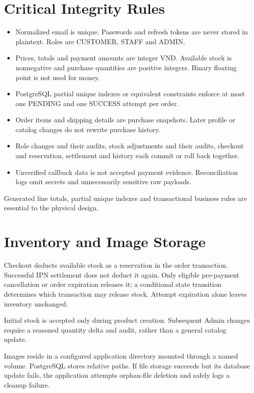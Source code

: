 \section{Critical Integrity Rules}
\begin{itemize}
\item Normalized email is unique. Passwords and refresh tokens are never stored in plaintext. Roles are CUSTOMER, STAFF and ADMIN.
\item Prices, totals and payment amounts are integer VND. Available stock is nonnegative and purchase quantities are positive integers. Binary floating point is not used for money.
\item PostgreSQL partial unique indexes or equivalent constraints enforce at most one PENDING and one SUCCESS attempt per order.
\item Order items and shipping details are purchase snapshots. Later profile or catalog changes do not rewrite purchase history.
\item Role changes and their audits, stock adjustments and their audits, checkout and reservation, settlement and history each commit or roll back together.
\item Unverified callback data is not accepted payment evidence. Reconciliation logs omit secrets and unnecessarily sensitive raw payloads.
\end{itemize}

Generated line totals, partial unique indexes and transactional business rules are essential to the physical design.

\section{Inventory and Image Storage}
Checkout deducts available stock as a reservation in the order transaction. Successful IPN settlement does not deduct it again. Only eligible pre-payment cancellation or order expiration releases it; a conditional state transition determines which transaction may release stock. Attempt expiration alone leaves inventory unchanged.

Initial stock is accepted only during product creation. Subsequent Admin changes require a reasoned quantity delta and audit, rather than a general catalog update.

Images reside in a configured application directory mounted through a named volume. PostgreSQL stores relative paths. If file storage succeeds but its database update fails, the application attempts orphan-file deletion and safely logs a cleanup failure.
